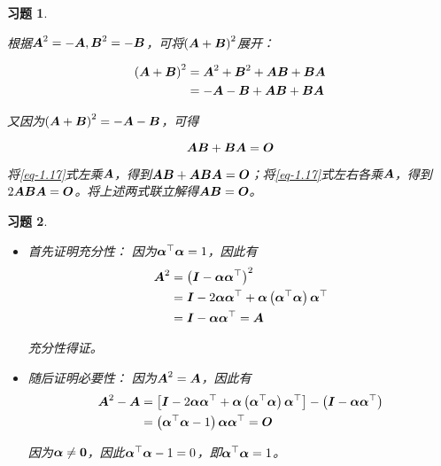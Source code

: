 \documentclass{ctexart}
\newtheorem{problem}{习题}[section]
\begin{document}
\begin{problem}\

根据\(\mata^2=-\mata,\matb^2=-\matb\)，可将\(\mypar{\mata+\matb}^2\)展开：

\begin{align*}
    \mypar{\mata+\matb}^2 & =\mata^2+\matb^2+\mata\matb+\matb\mata \\
                          & =-\mata-\matb+\mata\matb+\matb\mata
\end{align*}

又因为\(\mypar{\mata+\matb}^2=-\mata-\matb\)，可得

\begin{equation}\label{eq-1.17}
    \mata\matb+\matb\mata=\mato
\end{equation}

将\eqref{eq-1.17}式左乘\(\mata\)，得到\(\mata\matb+\mata\matb\mata=\mato\)；将\eqref{eq-1.17}式左右各乘\(\mata\)，得到\(2\mata\matb\mata=\mato\)。将上述两式联立解得\(\mata\matb=\mato\)。

\end{problem}

\setcounter{problem}{18}
\begin{problem}\

\begin{itemize}
    \item 首先证明充分性：
          因为\(\vecal^\top\vecal=1\)，因此有
          \begin{align*}
              \mata^2 & =\mypar{\mati-\vecal\vecal^\top}^2                                   \\
                      & =\mati-2\vecal\vecal^\top+\vecal\mypar{\vecal^\top\vecal}\vecal^\top \\
                      & =\mati-\vecal\vecal^\top=\mata
          \end{align*}

          充分性得证。

    \item 随后证明必要性：
          因为\(\mata^2=\mata\)，因此有
          \begin{align*}
              \mata^2-\mata & =\mat{\mati-2\vecal\vecal^\top+\vecal\mypar{\vecal^\top\vecal}\vecal^\top}-\mypar{\mati-\vecal\vecal^\top} \\
                            & =\mypar{\vecal^\top\vecal-1}\vecal\vecal^\top=\mato
          \end{align*}

          因为\(\vecal\neq\veczero\)，因此\(\vecal^\top\vecal-1=0\)，即\(\vecal^\top\vecal=1\)。
\end{itemize}

\end{problem}
\end{document}
